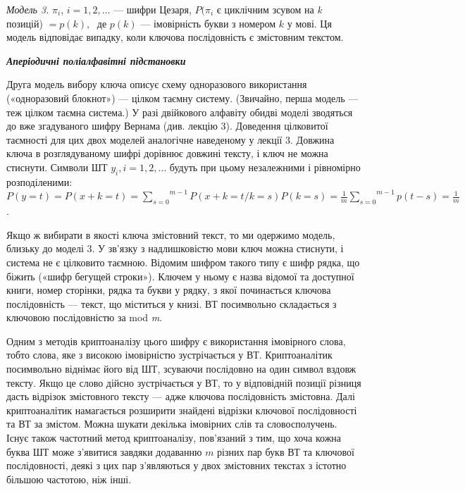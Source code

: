  \textit{Модель 3.  } ${\pi _{{i}}}$,  ${i=1,2,\dots}$ ---
шифри Цезаря,  ${P(\pi _{{i}}}$ є циклічним зсувом на \textit{k} позицій) 
${=p(k),\;}$ де  ${p(k)}$ --- імовірність букви з номером  ${k}$ у мові. Ця
модель відповідає випадку, коли ключова послідовність є змістовним текстом. 


\bigskip

{\centering\bfseries\itshape
Аперіодичні поліалфавітні підстановки
\par}


\bigskip

Друга модель вибору ключа описує схему одноразового використання («одноразовий
блокнот») --- цілком таємну систему. (Звичайно, перша модель --- теж цілком таємна
система.) У разі двійкового алфавіту обидві моделі зводяться до вже згадуваного
шифру Вернама (див. лекцію 3). Доведення цілковитої таємності для цих двох
моделей аналогічне наведеному у лекції 3. Довжина ключа в розглядуваному шифрі
дорівнює довжині тексту, і ключ не можна стиснути. Символи ШТ 
${y_{{i}},i=1,2,\dots}$ будуть при цьому незалежними і
рівномірно розподіленими: 
${P(y=t)=P(x+k=t)=\overset{{m-1}}{\underset{{s=0}}{\sum
}}{P(x+k=t/k=s)P(k=s)}=\frac{1}{m}\overset{{m-1}}{\underset{{s=0}}{\sum
}}{p(t-s)=\frac{1}{m}}}$.

Якщо ж вибирати в якості ключа змістовний текст, то ми одержимо модель, близьку
до моделі 3. У зв’язку з надлишковістю мови ключ можна стиснути, і система не є
цілковито таємною. Відомим шифром такого типу є шифр рядка, що біжить («шифр
бегущей строки»). Ключем у ньому є назва відомої та доступної книги, номер
сторінки, рядка та букви у рядку, з якої починається ключова послідовність ---
текст, що міститься у книзі. ВТ посимвольно складається з ключовою
послідовністю за mod \textit{m}.

Одним з методів криптоаналізу цього шифру є використання імовірного слова, тобто
слова, яке з високою імовірністю зустрічається у ВТ. Криптоаналітик посимвольно
віднімає його від ШТ, зсуваючи послідовно на один символ вздовж тексту. Якщо це
слово дійсно зустрічається у ВТ, то у відповідній позиції різниця дасть
відрізок змістовного тексту --- адже ключова послідовність змістовна. Далі
криптоаналітик намагається розширити знайдені відрізки ключової послідовності
та ВТ за змістом. Можна шукати декілька імовірних слів та словосполучень. Існує
також частотний метод криптоаналізу, пов’язаний з тим, що хоча кожна буква ШТ
може з’явитися завдяки додаванню  ${m}$ різних пар букв ВТ та ключової
послідовності, деякі з цих пар з’являються у двох змістовних текстах з істотно
більшою частотою, ніж інші.

